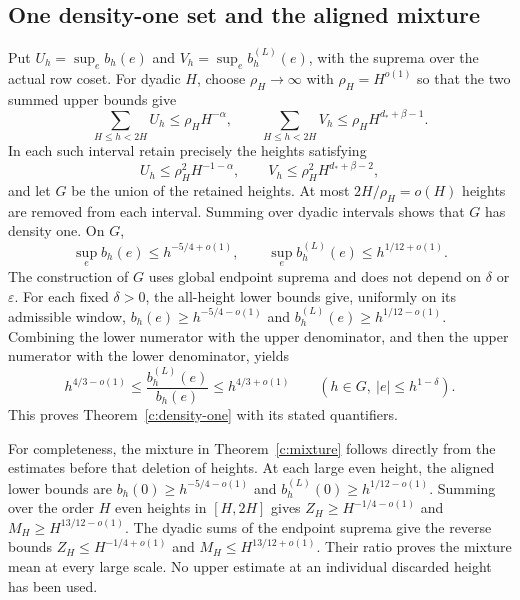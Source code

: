 \documentclass[11pt]{article}
\numberwithin{equation}{section}
\theoremstyle{definition}\newtheorem{definition}[theorem]{Definition}
\theoremstyle{remark}\newtheorem{remark}[theorem]{Remark}
\begin{document}
\subsection{One density-one set and the aligned mixture}
Put $U_h=\sup_e b_h(e)$ and $V_h=\sup_e b_h^{(L)}(e)$, with the
suprema over the actual row coset. For dyadic $H$, choose
$\rho_H\to\infty$ with $\rho_H=H^{o(1)}$ so that the two summed
upper bounds give
\[
 \sum_{H\le h<2H}U_h\le\rho_H H^{-\alpha},\qquad
 \sum_{H\le h<2H}V_h\le\rho_H H^{d_*+\beta-1}.
\]
In each such interval retain precisely the heights satisfying
\[
 U_h\le\rho_H^2 H^{-1-\alpha},\qquad
 V_h\le\rho_H^2 H^{d_*+\beta-2},
\]
and let $G$ be the union of the retained heights. At most
$2H/\rho_H=o(H)$ heights are removed from each interval. Summing
over dyadic intervals shows that $G$ has density one. On $G$,
\[
 \sup_e b_h(e)\le h^{-5/4+o(1)},\qquad
 \sup_e b_h^{(L)}(e)\le h^{1/12+o(1)}.
\]
The construction of $G$ uses global endpoint suprema and does not
depend on $\delta$ or $\varepsilon$. For each fixed $\delta>0$, the
all-height lower bounds give, uniformly on its admissible window,
$b_h(e)\ge h^{-5/4-o(1)}$ and
$b_h^{(L)}(e)\ge h^{1/12-o(1)}$. Combining the lower numerator with
the upper denominator, and then the upper numerator with the lower
denominator, yields
\[
 h^{4/3-o(1)}\le\frac{b_h^{(L)}(e)}{b_h(e)}
 \le h^{4/3+o(1)}\qquad(h\in G,\ |e|\le h^{1-\delta}).
\]
This proves Theorem~\ref{c:density-one} with its stated quantifiers.

For completeness, the mixture in Theorem~\ref{c:mixture} follows directly from the estimates before that deletion of heights. At each large even height, the aligned lower bounds are $b_h(0)\ge h^{-5/4-o(1)}$ and $b_h^{(L)}(0)\ge h^{1/12-o(1)}$. Summing over the order $H$ even heights in $[H,2H]$ gives $Z_H\ge H^{-1/4-o(1)}$ and $M_H\ge H^{13/12-o(1)}$. The dyadic sums of the endpoint suprema give the reverse bounds $Z_H\le H^{-1/4+o(1)}$ and $M_H\le H^{13/12+o(1)}$. Their ratio proves the mixture mean at every large scale. No upper estimate at an individual discarded height has been used.
\end{document}
